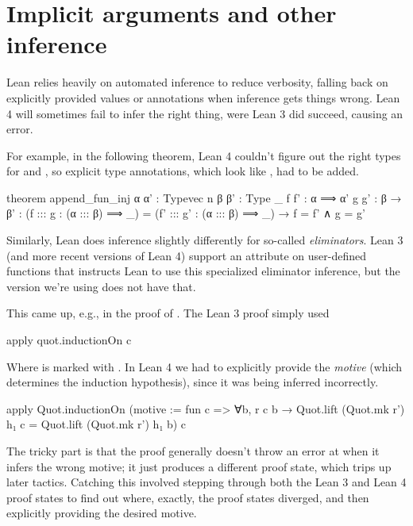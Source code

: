 \section{Implicit arguments and other inference}
Lean relies heavily on automated inference to reduce verbosity, falling back on explicitly provided
values or annotations when inference gets things wrong.
Lean 4 will sometimes fail to infer the right thing, were Lean 3 did succeed, causing an error.



For example, in the following theorem, Lean 4 couldn't figure out the right types for  and 
, so explicit type annotations, which look like , had to be added.
\begin{leancode}
  theorem append_fun_inj {α α' : Typevec n} {β β' : Type _} 
                         {f f' : α ⟹ α'} {g g' : β → β'} :
    (f ::: g : (α ::: β) ⟹ _) = (f' ::: g' : (α ::: β) ⟹ _) 
      → f = f' ∧ g = g'
\end{leancode}


Similarly, Lean does inference slightly differently for so-called \emph{eliminators}.
Lean 3 (and more recent versions of Lean 4) support an  attribute on user-defined
functions that instructs Lean to use this specialized eliminator inference, but the version we're using
does not have that.

This came up, e.g., in the proof of . The Lean 3 proof simply used
\begin{leancode}    
  apply quot.inductionOn c
\end{leancode}  
Where  is marked with .
In Lean 4 we had to explicitly provide the \emph{motive} (which determines the induction hypothesis), 
since it was being inferred incorrectly.
\begin{leancode}
  apply Quot.inductionOn (motive := fun c => ∀b, r c b → 
                                      Quot.lift (Quot.mk r') h₁ c 
                                      = Quot.lift (Quot.mk r') h₁ b) 
            c
\end{leancode}

The tricky part is that the proof generally doesn't throw an error at  when it
infers the wrong motive; it just produces a different proof state, which trips up later tactics.
Catching this involved stepping through both the Lean 3 and Lean 4 proof states to find out where, exactly, the proof states diverged, 
and then explicitly providing the desired motive.

